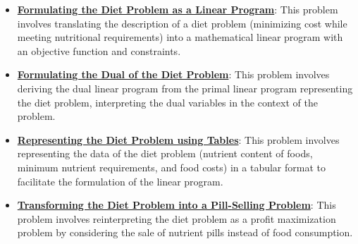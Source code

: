 \documentclass{article}%
\begin{document}
\begin{itemize}[leftmargin=*]%
\item \href{https://www.math.purdue.edu/~yipn/421/2024-09-19-DualityExamples.pdf#page=5}{\textbf{Formulating the Diet Problem as a Linear Program}}: This problem involves translating the description of a diet problem (minimizing cost while meeting nutritional requirements) into a mathematical linear program with an objective function and constraints.%
\item \href{https://www.math.purdue.edu/~yipn/421/2024-09-19-DualityExamples.pdf#page=8}{\textbf{Formulating the Dual of the Diet Problem}}: This problem involves deriving the dual linear program from the primal linear program representing the diet problem, interpreting the dual variables in the context of the problem.%
\item \href{https://www.math.purdue.edu/~yipn/421/2024-09-19-DualityExamples.pdf#page=3}{\textbf{Representing the Diet Problem using Tables}}: This problem involves representing the data of the diet problem (nutrient content of foods, minimum nutrient requirements, and food costs) in a tabular format to facilitate the formulation of the linear program.%
\item \href{https://www.math.purdue.edu/~yipn/421/2024-09-19-DualityExamples.pdf#page=7}{\textbf{Transforming the Diet Problem into a Pill{-}Selling Problem}}: This problem involves reinterpreting the diet problem as a profit maximization problem by considering the sale of nutrient pills instead of food consumption.%
\end{itemize}%
\end{document}
